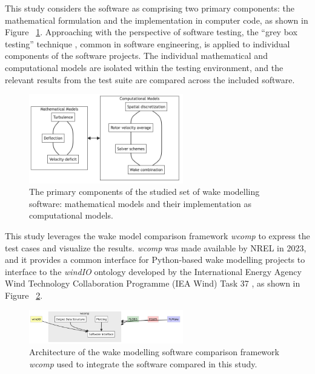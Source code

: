 \documentclass{iopconfser}
\newcommand{\ind}[]{\hspace{6mm}}
\begin{document}
This study considers the software as comprising two primary components: the mathematical formulation and the implementation in computer code, as shown in Figure ~\ref{fig:model_components}.
Approaching with the perspective of software testing, the “grey box testing” technique \cite{william2009software}, common in software engineering, is applied to individual components of the software projects.
The individual mathematical and computational models are isolated within the testing environment, and the relevant results from the test suite are compared across the included software.

\begin{figure}[!htb]
  \centering
  \includegraphics[width=0.6\textwidth]{figures/model_components.png}
  \caption{ The primary components of the studied set of wake modelling software: mathematical models and their implementation as computational models.}
  \label{fig:model_components}
\end{figure}

\ind{}This study leverages the wake model comparison framework \textit{wcomp} \cite{wcomp01} to express the test cases and visualize the results.
\textit{wcomp} was made available by NREL in 2023, and it provides a common interface for Python-based wake modelling projects to interface to the \textit{windIO} ontology developed by the International Energy Agency Wind Technology Collaboration Programme (IEA Wind) Task 37 \cite{bortolotti2022system}, as shown in Figure ~\ref{fig:wcomp_arch}.

\begin{figure}[!htb]
  \centering
  \includegraphics[width=0.6\textwidth]{figures/wcomp_architecture.png}
  \caption{Architecture of the wake modelling software comparison framework \textit{wcomp} used to integrate the software compared in this study.}
  \label{fig:wcomp_arch}
\end{figure}
\end{document}
